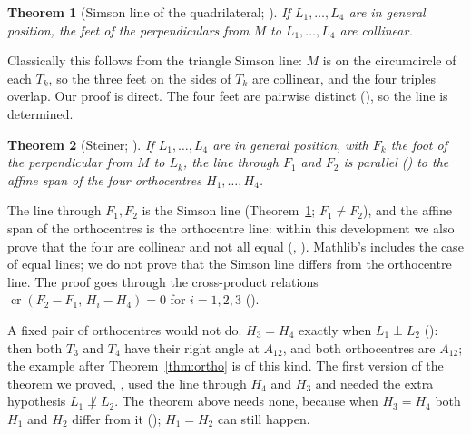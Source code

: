 \documentclass[11pt]{article}
\newtheorem{theorem}{Theorem}
\theoremstyle{definition}
\theoremstyle{remark}
\begin{document}
\begin{theorem}[Simson line of the quadrilateral; ]\label{thm:simson}
If $L_1,\dots,L_4$ are in general position, the feet of the perpendiculars from $M$ to
$L_1,\dots,L_4$ are collinear.
\end{theorem}
Classically this follows from the triangle Simson line: $M$ is on the circumcircle of each $T_k$, so
the three feet on the sides of $T_k$ are collinear, and the four triples overlap. Our proof is direct. The four feet are pairwise distinct (), so the
line is determined.

\begin{theorem}[Steiner; ]\label{thm:par}
If $L_1,\dots,L_4$ are in general position, with $F_k$ the foot of the perpendicular from $M$ to $L_k$,
the line through $F_1$ and $F_2$ is parallel () to the affine span of
the four orthocentres $H_1,\dots,H_4$.
\end{theorem}
The line through $F_1,F_2$ is the Simson line (Theorem~\ref{thm:simson}; $F_1\ne F_2$), and the affine
span of the orthocentres is the orthocentre line: within this development we also prove that the four
are collinear and not all equal (,
). Mathlib's  includes the
case of equal lines; we do not prove that the Simson line differs from the orthocentre line. The proof goes through the cross-product relations
$\operatorname{cr}(F_2-F_1,\,H_i-H_4)=0$ for $i=1,2,3$ ().

A fixed pair of orthocentres would not do. $H_3=H_4$ exactly when $L_1\perp L_2$
(): then both $T_3$ and $T_4$ have their right angle at $A_{12}$, and
both orthocentres are $A_{12}$; the example after Theorem~\ref{thm:ortho} is of this kind. The first
version of the theorem we proved, , used the line through
$H_4$ and $H_3$ and needed the extra hypothesis $L_1\not\perp L_2$. The theorem above needs none,
because when $H_3=H_4$ both $H_1$ and $H_2$ differ from it ();
$H_1=H_2$ can still happen.
\end{document}
